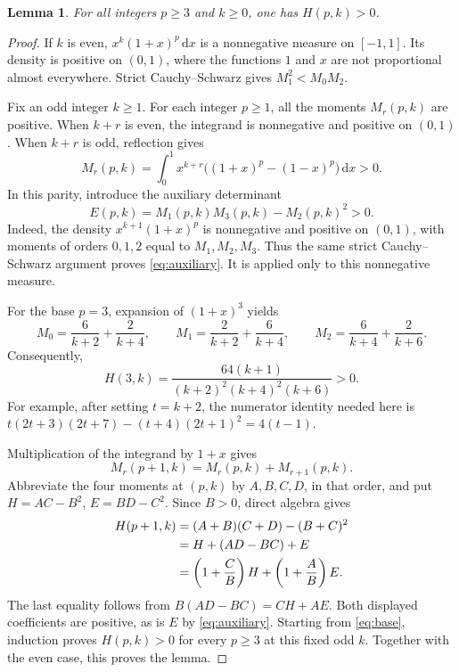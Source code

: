 \documentclass[11pt]{article}
\newtheorem{lemma}[theorem]{Lemma}
\newcommand{\dd}{\,\mathrm{d}}
\begin{document}
\begin{lemma}\label{lem:positive}
For all integers $p\ge3$ and $k\ge0$, one has $H(p,k)>0$.
\end{lemma}

\begin{proof}
If $k$ is even, $x^k(1+x)^p\dd x$ is a nonnegative measure on $[-1,1]$.
Its density is positive on $(0,1)$, where the functions $1$ and $x$
are not proportional almost everywhere. Strict Cauchy--Schwarz gives
$M_1^2<M_0M_2$.

Fix an odd integer $k\ge1$. For each integer $p\ge1$, all the moments
$M_r(p,k)$ are positive. When $k+r$ is even, the integrand is
nonnegative and positive on $(0,1)$. When $k+r$ is odd, reflection gives
\begin{equation}\label{eq:reflection}
 M_r(p,k)=\int_0^1 x^{k+r}\bigl((1+x)^p-(1-x)^p\bigr)\dd x>0.
\end{equation}
In this parity, introduce the auxiliary determinant
\begin{equation}\label{eq:auxiliary}
 E(p,k)=M_1(p,k)M_3(p,k)-M_2(p,k)^2>0.
\end{equation}
Indeed, the density $x^{k+1}(1+x)^p$ is nonnegative and positive on
$(0,1)$, with moments of orders $0,1,2$ equal to $M_1,M_2,M_3$.
Thus the same strict Cauchy--Schwarz argument proves
\eqref{eq:auxiliary}. It is applied only to this nonnegative measure.

For the base $p=3$, expansion of $(1+x)^3$ yields
\[
 M_0=\frac{6}{k+2}+\frac{2}{k+4},\qquad
 M_1=\frac{2}{k+2}+\frac{6}{k+4},\qquad
 M_2=\frac{6}{k+4}+\frac{2}{k+6}.
\]
Consequently,
\begin{equation}\label{eq:base}
 H(3,k)=\frac{64(k+1)}{(k+2)^2(k+4)^2(k+6)}>0.
\end{equation}
For example, after setting $t=k+2$, the numerator identity needed here is
$t(2t+3)(2t+7)-(t+4)(2t+1)^2=4(t-1)$.

Multiplication of the integrand by $1+x$ gives
\begin{equation}\label{eq:moment-step}
 M_r(p+1,k)=M_r(p,k)+M_{r+1}(p,k).
\end{equation}
Abbreviate the four moments at $(p,k)$ by $A,B,C,D$, in that order,
and put $H=AC-B^2$, $E=BD-C^2$. Since $B>0$, direct algebra gives
\begin{align}
 H(p+1,k)&=(A+B)(C+D)-(B+C)^2\notag\\
 &=H+(AD-BC)+E\notag\\
 &=\left(1+\frac CB\right)H+
   \left(1+\frac AB\right)E.\label{eq:induction}
\end{align}
The last equality follows from $B(AD-BC)=CH+AE$.
Both displayed coefficients are positive, as is $E$ by
\eqref{eq:auxiliary}. Starting from \eqref{eq:base}, induction proves
$H(p,k)>0$ for every $p\ge3$ at this fixed odd $k$. Together with
the even case, this proves the lemma.
\end{proof}
\end{document}
